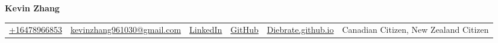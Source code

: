 \documentclass{article}
\begin{document}
    \fontsize{9}{14.5}
    \selectfont
    \begin{center}
        \begin{center}
            \huge\bfseries Kevin Zhang
        \end{center}
            \begin{tabular}{c|c|c|c|c|c}
                \href{tel:+16478966853}{+16478966853} &
                \href{mailto:kevinzhang961030@gmail.com}{kevinzhang961030@gmail.com} & 
                \href{https://www.linkedin.com/in/kevin-zhang-uoft/}{LinkedIn} & 
                \href{https://github.com/diebrate/}{GitHub} &
                \href{https://diebrate.github.io/}{Diebrate.github.io} &
                Canadian Citizen, New Zealand Citizen
        \end{tabular}
    \end{center}    
    \vspace{-0.75em}
    
    
    
    
    
    
  
\end{document}
